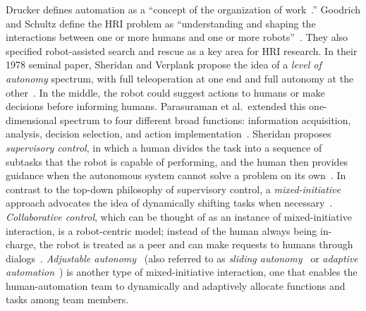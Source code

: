 Drucker defines automation as a ``concept of the organization of work~\cite{Drucker2006Practice}.'' Goodrich and Schultz define the HRI problem as ``understanding and shaping the interactions between one or more humans and one or more robots''~\cite{Goodrich2007HRISurvey}. They also specified robot-assisted search and rescue as a key area for HRI research. In their 1978 seminal paper, Sheridan and Verplank propose the idea of a \textit{level of autonomy} spectrum, with full teleoperation at one end and full autonomy at the other~\cite{Sheridan1978Human}. In the middle, the robot could suggest actions to humans or make decisions before informing humans. Parasuraman et al.\ extended this one-dimensional spectrum to four different broad functions: information acquisition, analysis, decision selection, and action implementation~\cite{Parasuraman2000Model}. Sheridan proposes \textit{supervisory control}, in which a human divides the task into a sequence of subtasks that the robot is capable of performing, and the human then provides guidance when the autonomous system cannot solve a problem on its own~\cite{Sheridan1992Telerobotics}. In contrast to the top-down philosophy of supervisory control, a \textit{mixed-initiative} approach advocates the idea of dynamically shifting tasks when necessary~\cite{Hearst1999Mixed}. \textit{Collaborative control}, which can be thought of as an instance of mixed-initiative interaction, is a robot-centric model; instead of the human always being in-charge, the robot is treated as a peer and can make requests to humans through dialogs~\cite{Fong1999Collaborative}. \textit{Adjustable autonomy}~\cite{Dorais2001Designing} (also referred to as \textit{sliding autonomy}~\cite{Dias2008SlidingAutonomy} or \textit{adaptive automation}~\cite{Rouse1988Adaptive}) is another type of mixed-initiative interaction, one that enables the human-automation team to dynamically and adaptively allocate functions and tasks among team members. 

